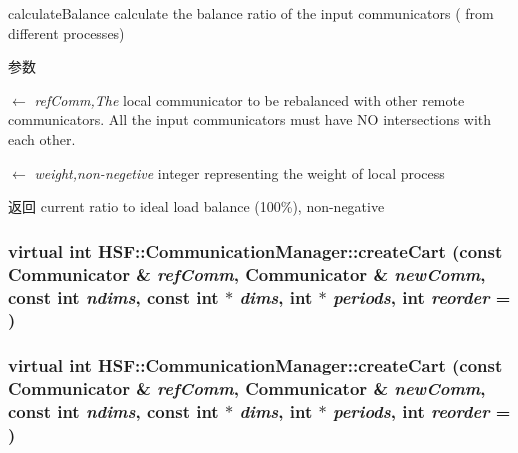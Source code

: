 calculateBalance calculate the balance ratio of the input communicators ( from different processes) 
\begin{DoxyParams}{参数}
\item[\mbox{$\leftarrow$} {\em refComm,The}]local communicator to be rebalanced with other remote communicators. All the input communicators must have NO intersections with each other. \item[\mbox{$\leftarrow$} {\em weight,non-\/negetive}]integer representing the weight of local process \end{DoxyParams}
\begin{DoxyReturn}{返回}
current ratio to ideal load balance (100\%), non-\/negative 
\end{DoxyReturn}
\hypertarget{classHSF_1_1CommunicationManager_a1128786fe9a8887c1e02f00bcabcd0a6}{
\subsubsection[{createCart}]{\setlength{\rightskip}{0pt plus 5cm}virtual int HSF::CommunicationManager::createCart (const {\bf Communicator} \& {\em refComm}, \/  {\bf Communicator} \& {\em newComm}, \/  const int {\em ndims}, \/  const int $\ast$ {\em dims}, \/  int $\ast$ {\em periods}, \/  int {\em reorder} = {})}}
\label{classHSF_1_1CommunicationManager_a1128786fe9a8887c1e02f00bcabcd0a6}
\hypertarget{classHSF_1_1CommunicationManager_a1128786fe9a8887c1e02f00bcabcd0a6}{
\subsubsection[{createCart}]{\setlength{\rightskip}{0pt plus 5cm}virtual int HSF::CommunicationManager::createCart (const {\bf Communicator} \& {\em refComm}, \/  {\bf Communicator} \& {\em newComm}, \/  const int {\em ndims}, \/  const int $\ast$ {\em dims}, \/  int $\ast$ {\em periods}, \/  int {\em reorder} = {})}}
\label{classHSF_1_1CommunicationManager_a1128786fe9a8887c1e02f00bcabcd0a6}
